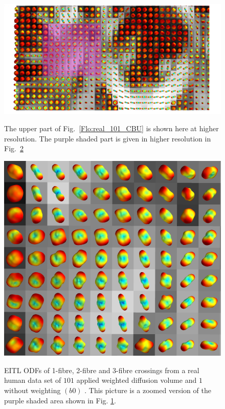 \documentclass{bioinfo}
\begin{document}
%
\begin{figure}
[th!]

\begin{centering}
\includegraphics[scale=0.8]{figures/real_101_eitl_005_left_up_purple}
\par\end{centering}

\caption{The upper part of Fig.~\ref{Flo:real_101_CBU} is shown here at higher
resolution. The purple shaded part is given in higher resolution in
Fig.~\ref{Flo:real_101_CBU_left_up_zoomed}}


\centering{}\label{Flo:real_101_CBU_left_up}
\end{figure}


%
\begin{figure}
[th!]

\begin{centering}
\includegraphics[scale=1.5]{figures/real_101_eitl_005_left_up_zoomed}
\par\end{centering}

\caption{EITL ODFs of 1-fibre, 2-fibre and 3-fibre crossings from a real human
data set of $101$ applied weighted diffusion volume and $1$ without
weighting $(b0)$ . This picture is a zoomed version of the purple
shaded area shown in Fig. \ref{Flo:real_101_CBU_left_up}.}


\centering{}\label{Flo:real_101_CBU_left_up_zoomed}
\end{figure}
\end{document}
